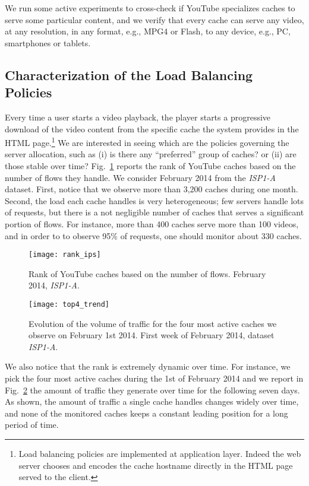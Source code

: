 \documentclass{acm_proc_article-sp}
\newcommand{\TApub}{\textit{ISP1-A}\xspace}
\begin{document}
We run some active experiments to cross-check if YouTube specializes caches to serve some particular content, and we verify that every cache can serve any video, at any resolution, in any format, e.g., MPG4 or Flash, to any device, e.g., PC, smartphones or tablets.



\subsection{Characterization of the Load Balancing Policies}

Every time a user starts a video playback, the player starts a progressive download of the video content from the specific cache the system provides in the HTML page.\footnote{Load balancing policies are implemented at application layer. Indeed the web server chooses and encodes the cache hostname directly in the HTML page served to the client.}
We are interested in seeing which are the policies governing the server allocation, such as (i) is there any ``preferred'' group of caches? or (ii) are those stable over time?
Fig.~\ref{fig:ip_rank} reports the rank of YouTube caches based on the number of flows they handle. We consider February 2014 from the \TApub dataset.
First, notice that we observe more than 3,200 caches during one month. Second, the load each cache handles is very heterogeneous; few servers handle lots of requests, but there is a not negligible number of caches that serves a significant portion of flows. For instance, more than 400 caches serve more than 100 videos, and in order to to observe 95\% of requests, one should monitor about 330 caches.

\begin{figure}[t!]
\centering
    \texttt{[image: rank\_ips]}
\caption{Rank of YouTube caches based on the number of flows. February 2014, \TApub.}
    \label{fig:ip_rank}
\end{figure}

\begin{figure}
\centering
    \texttt{[image: top4\_trend]}
\caption{Evolution of the volume of traffic for the four most active caches we observe on February 1st 2014. First week of February 2014, dataset \TApub.}
    \label{fig:tren4}
\end{figure}

We also notice that the rank is extremely dynamic over time. For instance, we pick the four most active caches during the 1st of February 2014 and we report in Fig.~\ref{fig:tren4} the amount of traffic they generate over time for the following seven days. As shown, the amount of traffic a single cache handles changes widely over time, and none of the monitored caches keeps a constant leading position for a long period of time.
\end{document}
